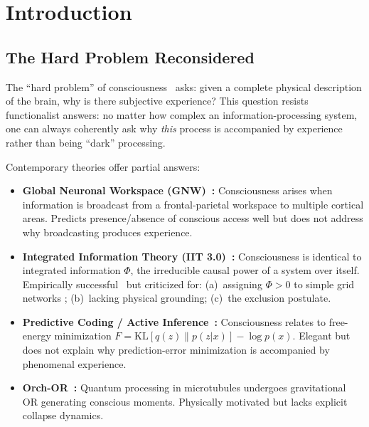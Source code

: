 \documentclass[12pt,a4paper]{article}
\numberwithin{equation}{section}
\begin{document}
\tableofcontents
\newpage

\section{Introduction}

\subsection{The Hard Problem Reconsidered}

The ``hard problem'' of consciousness~\citep{Chalmers1995} asks: given a complete
physical description of the brain, why is there subjective experience?
This question resists functionalist answers: no matter how complex an
information-processing system, one can always coherently ask why \emph{this}
process is accompanied by experience rather than being ``dark'' processing.

Contemporary theories offer partial answers:

\begin{itemize}[leftmargin=2em]
\item \textbf{Global Neuronal Workspace (GNW)~\citep{Dehaene2011}:}
  Consciousness arises when information is broadcast from a frontal-parietal
  workspace to multiple cortical areas.
  Predicts presence/absence of conscious access well but does not address
  why broadcasting produces experience.

\item \textbf{Integrated Information Theory (IIT 3.0)~\citep{Oizumi2014}:}
  Consciousness is identical to integrated information $\Phi$, the irreducible
  causal power of a system over itself. Empirically successful~\citep{Casarotto2016}
  but criticized for: (a)~assigning $\Phi>0$ to simple grid networks
  \citep{Aaronson2014}; (b)~lacking physical grounding; (c)~the exclusion postulate.

\item \textbf{Predictive Coding / Active Inference~\citep{Friston2010}:}
  Consciousness relates to free-energy minimization
  $F = \mathrm{KL}[q(z)\|p(z|x)] - \log p(x)$.
  Elegant but does not explain why prediction-error minimization
  is accompanied by phenomenal experience.

\item \textbf{Orch-OR~\citep{Hameroff2014}:}
  Quantum processing in microtubules undergoes gravitational OR generating
  conscious moments. Physically motivated but lacks explicit collapse dynamics.
\end{itemize}
\end{document}
